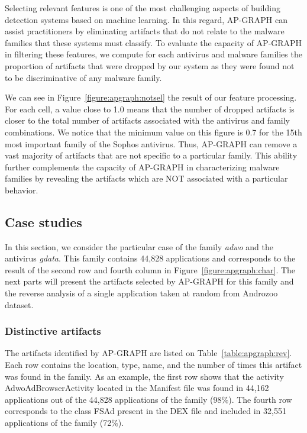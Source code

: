 Selecting relevant features is one of the most challenging aspects of building detection systems based on machine learning.
In this regard, AP-GRAPH can assist practitioners by eliminating artifacts that do not relate to the malware families that these systems must classify.
To evaluate the capacity of AP-GRAPH in filtering these features, we compute for each antivirus and malware families the proportion of artifacts that were dropped by our system as they were found not to be discriminative of any malware family.

We can see in Figure~\ref{figure:apgraph:notsel} the result of our feature processing.
For each cell, a value close to 1.0 means that the number of dropped artifacts is closer to the total number of artifacts associated with the antivirus and family combinations.
We notice that the minimum value on this figure is 0.7 for the 15th most important family of the Sophos antivirus.
Thus, AP-GRAPH can remove a vast majority of artifacts that are not specific to a particular family.
This ability further complements the capacity of AP-GRAPH in characterizing malware families by revealing the artifacts which are NOT associated with a particular behavior.
\subsection{Case studies}
In this section, we consider the particular case of the family \textit{adwo} and the antivirus \textit{gdata}.
This family contains 44,828 applications and corresponds to the result of the second row and fourth column in Figure~\ref{figure:apgraph:char}.
The next parts will present the artifacts selected by AP-GRAPH for this family and the reverse analysis of a single application taken at random from Androzoo dataset.
\subsubsection{Distinctive artifacts}



The artifacts identified by AP-GRAPH are listed on Table~\ref{table:apgraph:rev}.
Each row contains the location, type, name, and the number of times this artifact was found in the family.
As an example, the first row shows that the activity AdwoAdBrowserActivity located in the Manifest file was found in 44,162 applications out of the 44,828 applications of the family (98\%).
The fourth row corresponds to the class FSAd present in the DEX file and included in 32,551 applications of the family (72\%).

